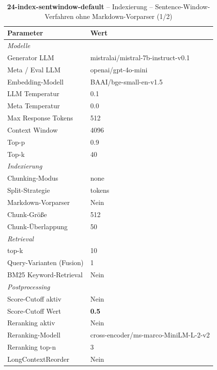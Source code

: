 \begin{table}[H]
\centering
\small
\setlength{\tabcolsep}{4pt}
\begin{tabular}{lp{8cm}}
\toprule
\textbf{Parameter} & \textbf{Wert} \\
\midrule
\multicolumn{2}{l}{\textit{Modelle}} \\
\midrule
\quad Generator LLM & mistralai/mistral-7b-instruct-v0.1 \\
\quad Meta / Eval LLM & openai/gpt-4o-mini \\
\quad Embedding-Modell & BAAI/bge-small-en-v1.5 \\
\quad LLM Temperatur & 0.1 \\
\quad Meta Temperatur & 0.0 \\
\quad Max Response Tokens & 512 \\
\quad Context Window & 4096 \\
\quad Top-p & 0.9 \\
\quad Top-k & 40 \\
\midrule
\multicolumn{2}{l}{\textit{Indexierung}} \\
\midrule
\quad Chunking-Modus & none \\
\quad Split-Strategie & tokens \\
\quad Markdown-Vorparser & Nein \\
\quad Chunk-Größe & 512 \\
\quad Chunk-Überlappung & 50 \\
\midrule
\multicolumn{2}{l}{\textit{Retrieval}} \\
\midrule
\quad top-k & 10 \\
\quad Query-Varianten (Fusion) & 1 \\
\quad BM25 Keyword-Retrieval & Nein \\
\midrule
\multicolumn{2}{l}{\textit{Postprocessing}} \\
\midrule
\quad Score-Cutoff aktiv & Nein \\
\quad Score-Cutoff Wert & \textbf{0.5} \\
\quad Reranking aktiv & Nein \\
\quad Reranking-Modell & cross-encoder/ms-marco-MiniLM-L-2-v2 \\
\quad Reranking top-n & 3 \\
\quad LongContextReorder & Nein \\
\bottomrule
\end{tabular}
\caption{\textbf{24-index-sentwindow-default} -- Indexierung -- Sentence-Window-Verfahren ohne Markdown-Vorparser (1/2)}
\label{tab:config_24_index_sentwindow_default_a}
\end{table}

